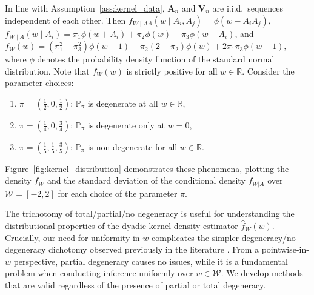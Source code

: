 \documentclass[11pt,lof]{puthesis}
\renewcommand{\P}{\ensuremath{\mathbb{P}}}
\newcommand{\R}{\ensuremath{\mathbb{R}}}
\newcommand{\bA}{\ensuremath{\mathbf{A}}}
\newcommand{\bV}{\ensuremath{\mathbf{V}}}
\newcommand{\cW}{\ensuremath{\mathcal{W}}}
\theoremstyle{break}
\theoremstyle{proof}
\begin{document}
In line with Assumption~\ref{ass:kernel_data}, $\bA_n$ and $\bV_n$ are i.i.d.\
sequences independent of each other. Then
$f_{W \mid AA}(w \mid A_i, A_j) = \phi(w - A_i A_j)$,\,
$f_{W \mid A}(w \mid A_i) = \pi_1 \phi(w + A_i) + \pi_2 \phi(w)
+ \pi_3 \phi(w - A_i)$, and
$f_W(w) = (\pi_1^2 + \pi_3^2) \phi(w-1) + \pi_2 (2 - \pi_2) \phi(w) + 2
\pi_1 \pi_3 \phi(w+1),$
where $\phi$ denotes the probability density function of the standard normal
distribution. Note that $f_W(w)$ is strictly positive for all $w \in \R$.
Consider the parameter choices:
%
\begin{enumerate}[label=(\roman*)]

  \item $\pi = \left( \frac{1}{2}, 0, \frac{1}{2} \right)$:\quad
    $\P_\pi$ is degenerate at all $w \in \R$,

  \item $\pi = \left( \frac{1}{4}, 0, \frac{3}{4} \right)$:\quad
    $\P_\pi$ is degenerate only at $w=0$,

  \item $\pi = \left( \frac{1}{5}, \frac{1}{5}, \frac{3}{5} \right)$:\quad
    $\P_\pi$ is non-degenerate for all $w \in \R$.

\end{enumerate}
%
Figure~\ref{fig:kernel_distribution} demonstrates these phenomena, plotting the
density $f_W$ and the standard deviation of the conditional
density $f_{W|A}$ over $\cW = [-2,2]$ for each choice of the parameter $\pi$.

The trichotomy of total/partial/no degeneracy is useful for understanding the
distributional properties of the dyadic kernel density estimator
$\hat{f}_W(w)$. Crucially, our need for uniformity in $w$ complicates the
simpler degeneracy/no degeneracy dichotomy observed previously in the
literature \citep{graham2024kernel}. From a pointwise-in-$w$
perspective, partial degeneracy causes no issues, while it is a fundamental
problem when conducting inference uniformly over $w \in \cW$. We develop
methods that are valid regardless of the presence of partial or total
degeneracy.
\end{document}
